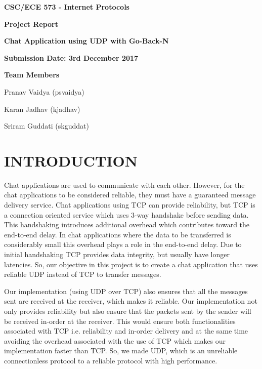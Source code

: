 \documentclass[10pt, pdftex, twocolumn]{report}
\begin{document}
	\begin{titlepage}
		\centering
		{\LARGE\bfseries CSC/ECE 573 - Internet Protocols}
		
		\vspace{1cm}
		
		{\Large\bfseries Project Report}
		
		\vspace{1cm}
		
		{\Large\bfseries Chat Application using UDP with Go-Back-N}
		
		\vspace{2cm}
		
		{\Large\bfseries Submission Date: 3rd December 2017}		
		
		\vspace{2cm}
		
		{\Large\bfseries Team Members}
		
		\vspace{0.5cm}
		
		{\Large Pranav Vaidya (psvaidya)}
		
		\vspace{0.5cm}
		
		{\Large Karan Jadhav (kjadhav)}
		
		\vspace{0.5cm}
		
		{\Large Sriram Guddati (skguddat)}
		
	\end{titlepage}
	
	\section*{INTRODUCTION}
	Chat applications are used to communicate with each other. However, for the chat applications to be considered reliable, they must have a guaranteed message delivery service. Chat applications using TCP can provide reliability, but TCP is a connection oriented service which uses 3-way handshake before sending data. This handshaking introduces additional overhead which contributes toward the end-to-end delay. In chat applications where the data to be transferred is considerably small this overhead plays a role in the end-to-end delay. Due to initial handshaking TCP provides data integrity, but usually have longer latencies. So, our objective in this project is to create a chat application that uses reliable UDP instead of TCP to transfer messages.
	
	Our implementation (using UDP over TCP) also ensures that all the messages sent are received at the receiver, which makes it reliable. Our implementation not only provides reliability but also ensure that the packets sent by the sender will be received in-order at the receiver.  This would ensure both functionalities associated with TCP i.e. reliability and in-order delivery and at the same time avoiding the overhead associated with the use of TCP which makes our implementation faster than TCP. So, we made UDP, which is an unreliable connectionless protocol to a reliable protocol with high performance.
	
\end{document}
